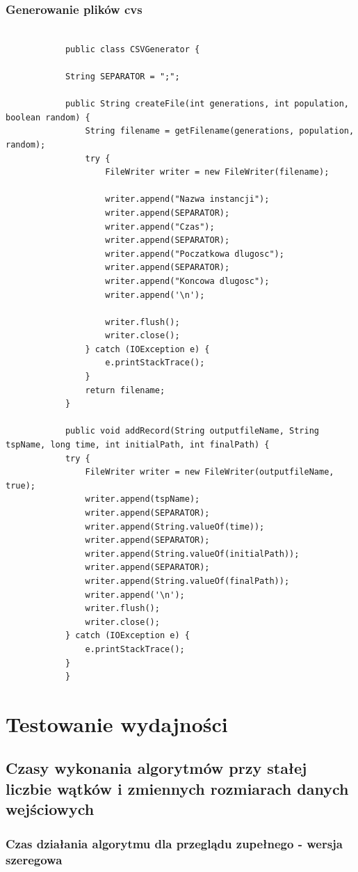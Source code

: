 \documentclass{article}
\begin{document}
		\subsubsection{Generowanie plików cvs}
			\begin{lstlisting}[xleftmargin=-150pt]
			
			public class CSVGenerator {
			
			String SEPARATOR = ";";
			
			public String createFile(int generations, int population, boolean random) {
				String filename = getFilename(generations, population, random);
				try {
					FileWriter writer = new FileWriter(filename);
					
					writer.append("Nazwa instancji");
					writer.append(SEPARATOR);
					writer.append("Czas");
					writer.append(SEPARATOR);
					writer.append("Poczatkowa dlugosc");
					writer.append(SEPARATOR);
					writer.append("Koncowa dlugosc");
					writer.append('\n');
					
					writer.flush();
					writer.close();
				} catch (IOException e) {
					e.printStackTrace();
				}
				return filename;
			}
			
			public void addRecord(String outputfileName, String tspName, long time, int initialPath, int finalPath) {
			try {
				FileWriter writer = new FileWriter(outputfileName, true);
				writer.append(tspName);
				writer.append(SEPARATOR);
				writer.append(String.valueOf(time));
				writer.append(SEPARATOR);
				writer.append(String.valueOf(initialPath));
				writer.append(SEPARATOR);
				writer.append(String.valueOf(finalPath));
				writer.append('\n');
				writer.flush();
				writer.close();
			} catch (IOException e) {
				e.printStackTrace();
			}
			}
			\end{lstlisting}
\section{Testowanie wydajności}	
	\subsection{Czasy wykonania algorytmów przy stałej liczbie wątków i zmiennych rozmiarach danych wejściowych}
		
		
		
		\subsubsection{Czas działania algorytmu dla przeglądu zupełnego - wersja szeregowa}
			
\end{document}
